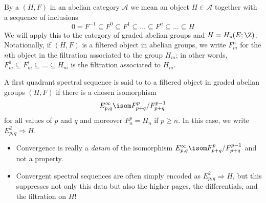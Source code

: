 By a  $(H, F)$ in an abelian category $\mathcal{A}$ we mean an object $H \in \mathcal{A}$ together with a sequence of inclusions
\begin{equation*}
	0 = F^{-1} \subseteq F^0 \subseteq F^1 \subseteq \ldots \subseteq F^n \subseteq \ldots \subseteq H
\end{equation*}
We will apply this to the category of graded abelian groups and $H = H_*(E; \Z)$.
Notationally, if $(H, F)$ is a filtered object in abelian groups, we write $F^n_m$ for the $n$th object in the filtration associated to the group $H_m$; in other words, $F^0_m \subseteq F^1_m \subseteq \ldots \subseteq H_m$ is the filtration associated to $H_m$.
\begin{definition}
	A first quadrant spectral sequence is said to  to a filtered object in graded abelian groups $(H, F)$ if there is a chosen isomorphism
	\begin{equation*}
		E^\infty_{p, q} \isom F^p_{p + q} / F^{p - 1}_{p + q}
	\end{equation*}
	for all values of $p$ and $q$ and moreover $F^p_n = H_n$ if $p \geq n$.
	In this case, we write $E^2_{p, q} \Rightarrow H$.
\end{definition}
\begin{remark}
	\leavevmode
	\begin{itemize}
		\item Convergence is really a \emph{datum} of the isomorphism $E^\infty_{p, q} \isom F^p_{p + q} / F^{p - 1}_{p + q}$ and not a property.
		\item Convergent spectral sequences are often simply encoded as $E^2_{p, q} \Rightarrow H$, but this suppresses not only this data but also the higher pages, the differentials, and the filtration on $H$!
	\end{itemize}
\end{remark}

